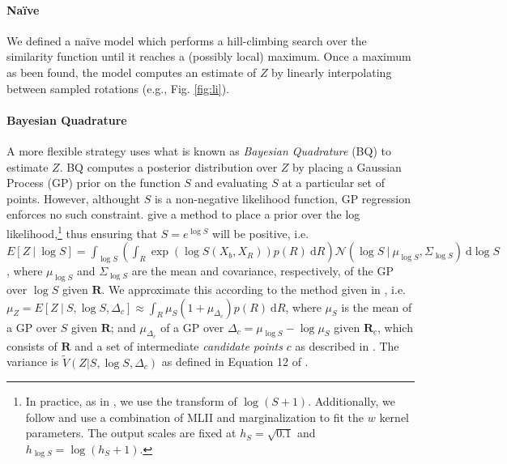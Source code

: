 \documentclass{article} %
\newcommand{\naive}[0]{na\"ive}
\newcommand{\Naive}[0]{Na\"ive}
\begin{document}
\paragraph{\Naive{}}

We defined a \naive{} model which performs a hill-climbing search over
the similarity function until it reaches a (possibly local)
maximum. Once a maximum as been found, the model computes an estimate
of $Z$ by linearly interpolating between sampled rotations (e.g.,
Fig. \ref{fig:li}).

\paragraph{Bayesian Quadrature}

A more flexible strategy uses what is known as \emph{Bayesian
  Quadrature} (BQ) \cite{Diaconis:1988uo,OHagan:1991tx} to estimate
$Z$.  BQ computes a posterior distribution over $Z$ by placing a
Gaussian Process (GP) prior on the function $S$ and evaluating $S$ at
a particular set of points. However, althought $S$ is a non-negative
likelihood function, GP regression enforces no such
constraint. \cite{Osborne:2012tm} give a method to place a prior over
the log likelihood,\footnote{In practice, as in \cite{Osborne:2012tm},
  we use the transform of $\log(S+1)$. Additionally, we follow
  \cite{Osborne:2012tm} and use a combination of MLII and
  marginalization to fit the $w$ kernel parameters. The output scales
  are fixed at $h_S=\sqrt{0.1}$ and $h_{\log S}=\log(h_S + 1)$.} thus
ensuring that $S=e^{\log S}$ will be positive, i.e.  $E[Z\ \vert \
\log S]=\int_{\log S}\left(\int_R \exp(\log{S(X_b,X_R)})p(R)\
  \mathrm{d}R\right)\mathcal{N}\left(\log{S}\ \vert \ \mu_{\log S},
  \Sigma_{\log S}\right)\ \mathrm{d}\log S$, where $\mu_{\log S}$ and
$\Sigma_{\log S}$ are the mean and covariance, respectively, of the GP
over $\log S$ given $\mathbf{R}$. We approximate this according to the
method given in \cite{Osborne:2012tm}, i.e. $\mu_Z=E[Z\ \vert \ S,
\log S, \Delta_c] \approx \int_R \mu_{S}(1 + \mu_{\Delta_c}) p(R)\
\mathrm{d}R$, where $\mu_S$ is the mean of a GP over $S$ given
$\mathbf{R}$; and $\mu_{\Delta_c}$ of a GP over $\Delta_c=\mu_{\log S}
- \log \mu_S$ given $\mathbf{R}_c$, which consists of $\mathbf{R}$ and
a set of intermediate \emph{candidate points} $c$ as described in
\cite{Osborne:2012tm}. The variance is $\tilde{V}(Z\vert S, \log S,
\Delta_c)$ as defined in Equation 12 of \cite{Osborne:2012tm}.
\end{document}
